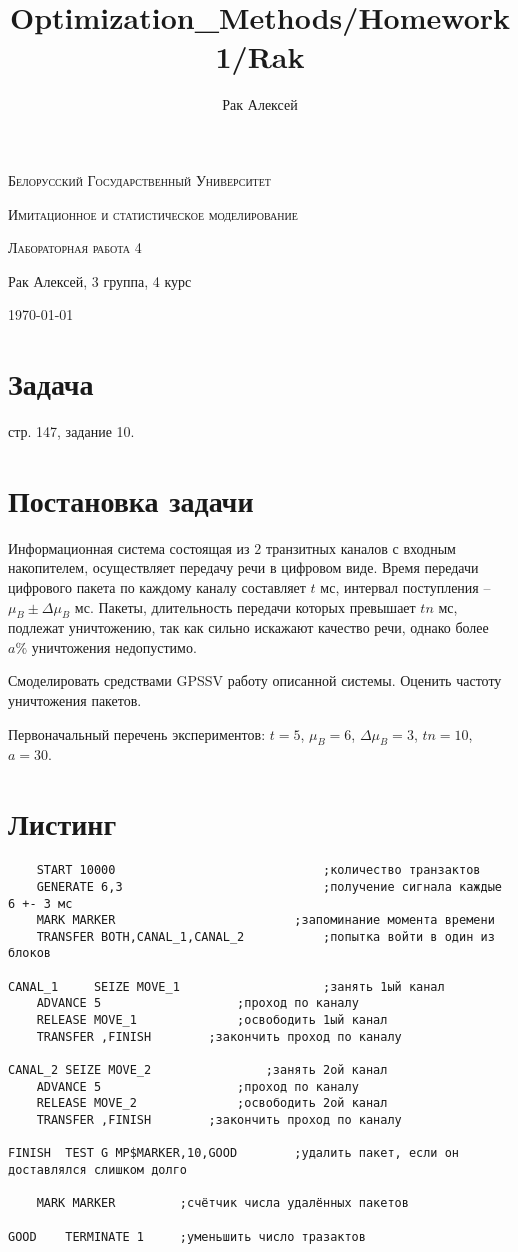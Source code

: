 \documentclass[10pt]{scrartcl}
\makeatletter
\newcommand{\verbatimfont}[1]{\renewcommand{\verbatim@font}{\ttfamily#1}}
\makeatother
\begin{document}
\author{Рак Алексей}
\title{Optimization_Methods/Homework1/Rak}
\begin{titlepage}
		\centering
		{\scshape\LARGE Белорусский Государственный Университет \par}
        \vfill
        {\scshape\LARGE 	Имитационное и статистическое моделирование \par}
        \vspace{1cm}
        {\scshape\LARGE Лабораторная работа 4\par}
        \vspace{2cm}
        {\LARGE Рак Алексей, 3 группа, 4 курс\par}
        \vfill
        {\large \today}
\end{titlepage}
\section*{Задача}
стр. 147, задание 10.	
\section*{Постановка задачи}
Информационная система состоящая из $2$ транзитных каналов с входным накопителем, осуществляет передачу речи в цифровом виде. Время передачи цифрового пакета по каждому каналу составляет $t$ мс, интервал поступления -- $\mu_B \pm \Delta \mu_B$ мс. Пакеты, длительность передачи которых превышает $tn$ мс, подлежат уничтожению, так как сильно искажают качество речи, однако более $a\%$ уничтожения недопустимо.

Смоделировать средствами GPSSV работу описанной системы. Оценить частоту уничтожения пакетов.

Первоначальный перечень экспериментов: $t = 5$, $\mu_B = 6$, $\Delta \mu_B = 3$, $tn = 10$, $a = 30$.
\section*{Листинг}
\verbatimfont{\small}
\begin{verbatim}
    START 10000                				;количество транзактов
    GENERATE 6,3                    		;получение сигнала каждые 6 +- 3 мс	
    MARK MARKER							;запоминание момента времени
    TRANSFER BOTH,CANAL_1,CANAL_2           ;попытка войти в один из блоков
 
CANAL_1     SEIZE MOVE_1                    ;занять 1ый канал
    ADVANCE 5                   ;проход по каналу
    RELEASE MOVE_1              ;освободить 1ый канал
    TRANSFER ,FINISH        ;закончить проход по каналу
 
CANAL_2 SEIZE MOVE_2                ;занять 2ой канал
    ADVANCE 5                   ;проход по каналу
    RELEASE MOVE_2              ;освободить 2ой канал
    TRANSFER ,FINISH        ;закончить проход по каналу
 
FINISH  TEST G MP$MARKER,10,GOOD		;удалить пакет, если он доставлялся слишком долго
 
    MARK MARKER			;счётчик числа удалённых пакетов
 
GOOD    TERMINATE 1		;уменьшить число тразактов
\end{verbatim}
\end{document}

